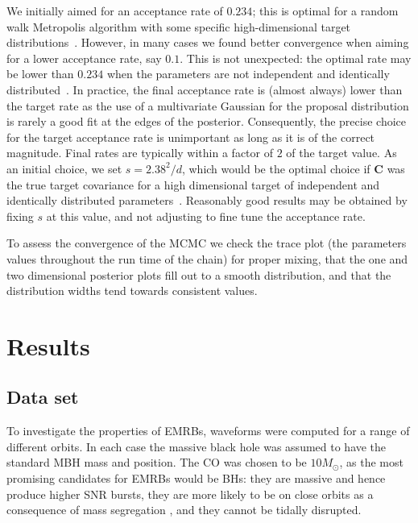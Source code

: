 \documentclass[useAMS,usedcolumn,usegraphicx,usenatbib]{mn2e}
\begin{document}
We initially aimed for an acceptance rate of $0.234$; this is optimal for a random walk Metropolis algorithm with some specific high-dimensional target distributions~\citep{Gelman1996,Roberts1997,Roberts2001,Bedard2007}. However, in many cases we found better convergence when aiming for a lower acceptance rate, say $0.1$. This is not unexpected: the optimal rate may be lower than $0.234$ when the parameters are not independent and identically distributed~\citep{Bedard2007,Bedard2008,Bedard2008a}. In practice, the final acceptance rate is (almost always) lower than the target rate as the use of a multivariate Gaussian for the proposal distribution is rarely a good fit at the edges of the posterior. Consequently, the precise choice for the target acceptance rate is unimportant as long as it is of the correct magnitude. Final rates are typically within a factor of $2$ of the target value. As an initial choice, we set $s = 2.38^2/d$, which would be the optimal choice if $\boldsymbol{C}$ was the true target covariance for a high dimensional target of independent and identically distributed parameters~\citep{Gelman1996,Roberts1997,Roberts2001,Haario2001}. Reasonably good results may be obtained by fixing $s$ at this value, and not adjusting to fine tune the acceptance rate.

To assess the convergence of the MCMC we check the trace plot (the parameters values throughout the run time of the chain) for proper mixing, that the one and two dimensional posterior plots fill out to a smooth distribution, and that the distribution widths tend towards consistent values.

\section{Results}\label{sec:Results}

\subsection{Data set}

To investigate the properties of EMRBs, waveforms were computed for a range of different orbits. In each case the massive black hole was assumed to have the standard MBH mass and position. The CO was chosen to be $10 M_\odot$, as the most promising candidates for EMRBs would be BHs: they are massive and hence produce higher SNR bursts, they are more likely to be on close orbits as a consequence of mass segregation \citep{Bahcall1977, Alexander2009}, and they cannot be tidally disrupted.
\end{document}
